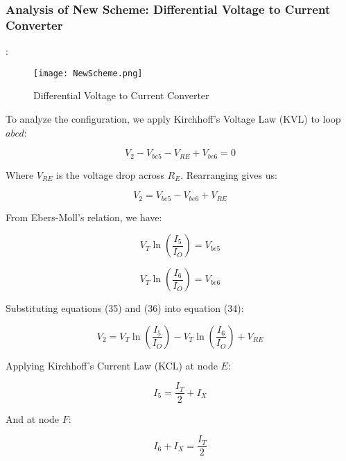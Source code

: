 \documentclass[a4paper,9pt,twoside,openany,twocolumn]{memoir}
\begin{document}
\subsubsection{Analysis of New Scheme: Differential Voltage to Current Converter}:

\begin{figure}[h]
    \centering
    \texttt{[image: NewScheme.png]} %
    \caption{Differential Voltage to Current Converter}
    \label{fig:NewScheme}
\end{figure}

To analyze the configuration, we apply Kirchhoff's Voltage Law (KVL) to loop \( abcd \):

\begin{equation}
V_2 - V_{be5} - V_{RE} + V_{be6} = 0 \tag{33}
\end{equation}

Where \( V_{RE} \) is the voltage drop across \( R_E \). Rearranging gives us:

\begin{equation}
V_2 = V_{be5} - V_{be6} + V_{RE} \tag{34}
\end{equation}

From Ebers-Moll's relation, we have:

\begin{equation}
V_T \ln \left( \frac{I_5}{I_O} \right) = V_{be5} \tag{35}
\end{equation}

\begin{equation}
V_T \ln \left( \frac{I_6}{I_O} \right) = V_{be6} \tag{36}
\end{equation}

Substituting equations (35) and (36) into equation (34):

\begin{equation}
V_2 = V_T \ln \left( \frac{I_5}{I_O} \right) - V_T \ln \left( \frac{I_6}{I_O} \right) + V_{RE} \tag{37}
\end{equation}

Applying Kirchhoff's Current Law (KCL) at node \( E \):

\begin{equation}
I_5 = \frac{I_T}{2} + I_X \tag{38}
\end{equation}

And at node \( F \):

\begin{equation}
I_6 + I_X = \frac{I_T}{2} \tag{7}
\end{equation}
\end{document}
